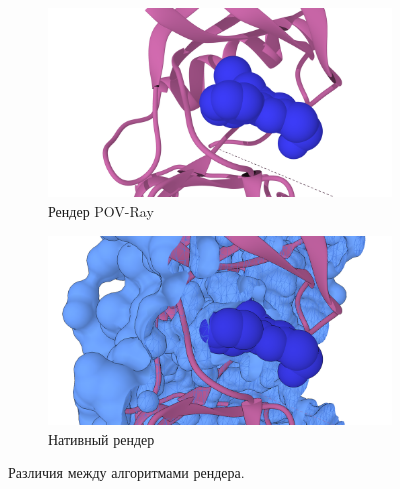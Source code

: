 \begin{figure}
\begin{subfigure}{\linewidth}
    \centering
    \includegraphics[width=\linewidth]{Guide/Figures/POV-render-nosurf.png}
    \caption{Рендер POV-Ray}
    \label{fig:pov}
    \vspace{1em}
\end{subfigure}
\begin{subfigure}{\linewidth}
    \centering
    \includegraphics[width=\linewidth]{Guide/Figures/Chimera-render.png}
    \caption{Нативный рендер}
    \label{fig:chi}
\end{subfigure}
\caption{Различия между алгоритмами рендера.}
\label{fig:render}
\end{figure}\clearpage
